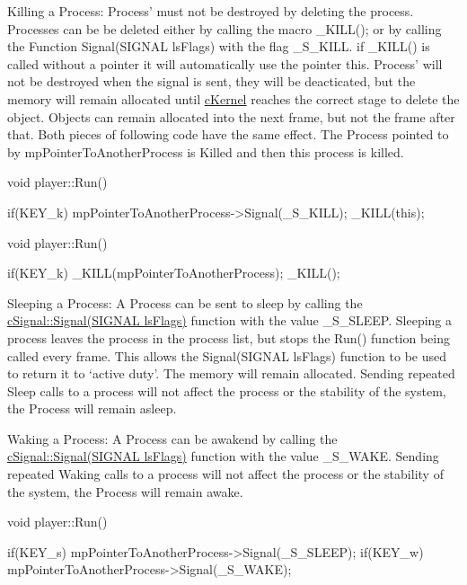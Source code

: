 Killing a Process: Process' must not be destroyed by deleting the process. Processes can be be deleted either by calling the macro \_\-KILL(); or by calling the Function Signal(SIGNAL lsFlags) with the flag \_\-S\_\-KILL. if \_\-KILL() is called without a pointer it will automatically use the pointer this. Process' will not be destroyed when the signal is sent, they will be deacticated, but the memory will remain allocated until \hyperlink{classc_kernel}{cKernel} reaches the correct stage to delete the object. Objects can remain allocated into the next frame, but not the frame after that. Both pieces of following code have the same effect. The Process pointed to by mpPointerToAnotherProcess is Killed and then this process is killed. 
\begin{DoxyCode}
 void player::Run()
 {

 if(KEY_k)
 {
 mpPointerToAnotherProcess->Signal(_S_KILL);
 _KILL(this);
 }

 }
\end{DoxyCode}



\begin{DoxyCode}
 void player::Run()
 {

 if(KEY_k)
        {
         _KILL(mpPointerToAnotherProcess);
         _KILL();
        }

 }
\end{DoxyCode}


Sleeping a Process: A Process can be sent to sleep by calling the \hyperlink{classc_signal_a545074be1da41d00050bed3cd2fb2305}{cSignal::Signal(SIGNAL lsFlags)} function with the value \_\-S\_\-SLEEP. Sleeping a process leaves the process in the process list, but stops the Run() function being called every frame. This allows the Signal(SIGNAL lsFlags) function to be used to return it to ‘active duty’. The memory will remain allocated. Sending repeated Sleep calls to a process will not affect the process or the stability of the system, the Process will remain asleep.

Waking a Process: A Process can be awakend by calling the \hyperlink{classc_signal_a545074be1da41d00050bed3cd2fb2305}{cSignal::Signal(SIGNAL lsFlags)} function with the value \_\-S\_\-WAKE. Sending repeated Waking calls to a process will not affect the process or the stability of the system, the Process will remain awake. 
\begin{DoxyCode}
 void player::Run()
 {

 if(KEY_s) mpPointerToAnotherProcess->Signal(_S_SLEEP);
 if(KEY_w) mpPointerToAnotherProcess->Signal(_S_WAKE);

 }
\end{DoxyCode}


